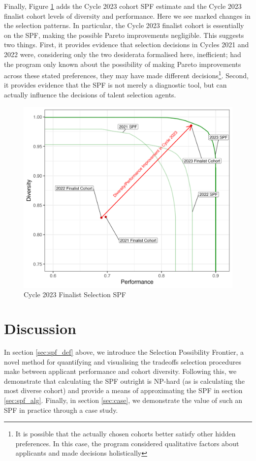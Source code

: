 Finally, Figure \ref{fig:yr3_spf} adds the Cycle 2023 cohort SPF estimate and the Cycle 2023 finalist cohort levels of diversity and performance. Here we see marked changes in the selection patterns. In particular, the Cycle 2023 finalist cohort is essentially on the SPF, making the possible Pareto improvements negligible. This suggests two things. First, it provides evidence that selection decisions in Cycles 2021 and 2022 were, considering only the two desiderata formalised here, inefficient; had the program only known about the possibility of making Pareto improvements across these stated preferences, they may have made different decisions\footnote{It is possible that the actually chosen cohorts better satisfy other hidden preferences. In this case, the program considered qualitative factors about applicants and made decisions holistically}. Second, it provides evidence that the SPF is not merely a diagnostic tool, but can actually influence the decisions of talent selection agents.

\begin{figure}[htb]
    \centering
    \includegraphics[width=.6\textwidth,keepaspectratio]{figures/spf/yr3_spf_finalist.png}
    \caption{Cycle 2023 Finalist Selection SPF}\label{fig:yr3_spf}
\end{figure}

\section{Discussion}\label{sec:disc}
In section \ref{sec:spf_def} above, we introduce the Selection Possibility Frontier, a novel method for quantifying and visualising the tradeoffs selection procedures make between applicant performance and cohort diversity. Following this, we demonstrate that calculating the SPF outright is NP-hard (as is calculating the most diverse cohort) and provide a means of approximating the SPF in section \ref{sec:spf_alg}. Finally, in section \ref{sec:case}, we demonstrate the value of such an SPF in practice through a case study.

